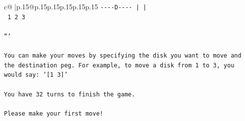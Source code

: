 \documentclass{article}
\begin{document}
{\begin{supertabular}{c@{$\;$}|p{.15\linewidth}@{}p{.15\linewidth}p{.15\linewidth}p{.15\linewidth}p{.15\linewidth}p{.15\linewidth}}
{{{\texttt{{-}{-}{-}{-}D{-}{-}{-}{-}     |         |    } \\
\texttt{    1         2         3    } \\
\\ 
\texttt{```} \\
\\ 
\texttt{You can make your moves by specifying the disk you want to move and the destination peg. For example, to move a disk from 1 to 3, you would say: '{[}1 3{]}'} \\
\\ 
\texttt{You have 32 turns to finish the game.} \\
\\ 
\texttt{Please make your first move!} \\
            }
        }
    }
     \\ \\


\end{supertabular}}
\end{document}
